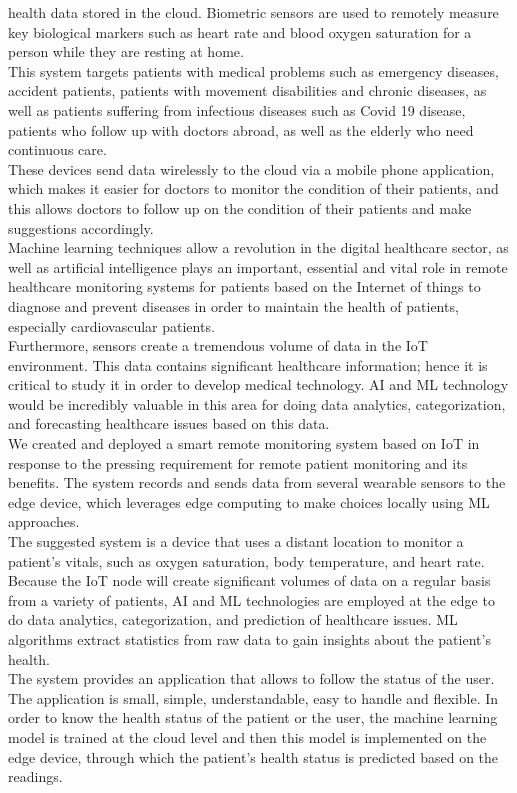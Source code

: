 \documentclass{bmcart}
\begin{document}
health data stored in the cloud. Biometric sensors are used to remotely measure
key biological markers such as heart rate and blood oxygen saturation for a
person while they are resting at home.\\
This system targets patients with medical problems such as emergency diseases,
accident patients, patients with movement disabilities and chronic diseases, as
well as patients suffering from infectious diseases such as Covid 19 disease,
patients who follow up with doctors abroad, as well as the elderly who need
continuous care.\\
These devices send data wirelessly to the cloud via a mobile phone application,
which makes it easier for doctors to monitor the condition of their patients,
and this allows doctors to follow up on the condition of their patients and make
suggestions accordingly.\\
Machine learning techniques allow a revolution in the digital healthcare sector,
as well as artificial intelligence plays an important, essential and vital role
in remote healthcare monitoring systems for patients based on the Internet of
things to diagnose and prevent diseases in order to maintain the health of
patients, especially cardiovascular patients.\\
Furthermore, sensors create a tremendous volume of data in the IoT environment.
This data contains significant healthcare information; hence it is critical to
study it in order to develop medical technology. AI and ML technology would be
incredibly valuable in this area for doing data analytics, categorization, and
forecasting healthcare issues based on this data.\\
We created and deployed a smart remote monitoring system based on IoT in
response to the pressing requirement for remote patient monitoring and its
benefits. The system records and sends data from several wearable sensors to the
edge device, which leverages edge computing to make choices locally using ML
approaches.\\
The suggested system is a device that uses a distant location to monitor a
patient's vitals, such as oxygen saturation, body temperature, and heart rate.\\
Because the IoT node will create significant volumes of data on a regular basis
from a variety of patients, AI and ML technologies are employed at the edge to
do data analytics, categorization, and prediction of healthcare issues. ML
algorithms extract statistics from raw data to gain insights about the patient's
health.\\
The system provides an application that allows to follow the status of the user.
The application is small, simple, understandable, easy to handle and flexible.
In order to know the health status of the patient or the user, the machine
learning model is trained at the cloud level and then this model is implemented
on the edge device, through which the patient’s health status is predicted based
on the readings.\\
\end{document}
